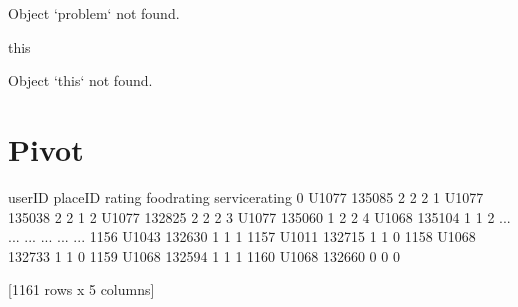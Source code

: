 \documentclass[letterpaper,10pt,english]{jupyterBook}
\begin{document}
\begin{sphinxVerbatim}[commandchars=\\\{\}]
Object `problem` not found.
\end{sphinxVerbatim}

\begin{sphinxVerbatim}[commandchars=\\\{\}]
                this
\end{sphinxVerbatim}

\begin{sphinxVerbatim}[commandchars=\\\{\}]
Object `this` not found.
\end{sphinxVerbatim}


\chapter{Pivot}
\label{\detokenize{c3_data_preprocessing/pivot:pivot}}\label{\detokenize{c3_data_preprocessing/pivot::doc}}
\begin{sphinxVerbatim}[commandchars=\\\{\}]
   
\end{sphinxVerbatim}

\begin{sphinxVerbatim}[commandchars=\\\{\}]
  
\end{sphinxVerbatim}

\begin{sphinxVerbatim}[commandchars=\\\{\}]
\end{sphinxVerbatim}

\begin{sphinxVerbatim}[commandchars=\\\{\}]
     userID  placeID  rating  food\PYGZus{}rating  service\PYGZus{}rating
0     U1077   135085       2            2               2
1     U1077   135038       2            2               1
2     U1077   132825       2            2               2
3     U1077   135060       1            2               2
4     U1068   135104       1            1               2
...     ...      ...     ...          ...             ...
1156  U1043   132630       1            1               1
1157  U1011   132715       1            1               0
1158  U1068   132733       1            1               0
1159  U1068   132594       1            1               1
1160  U1068   132660       0            0               0

[1161 rows x 5 columns]
\end{sphinxVerbatim}
\end{document}
